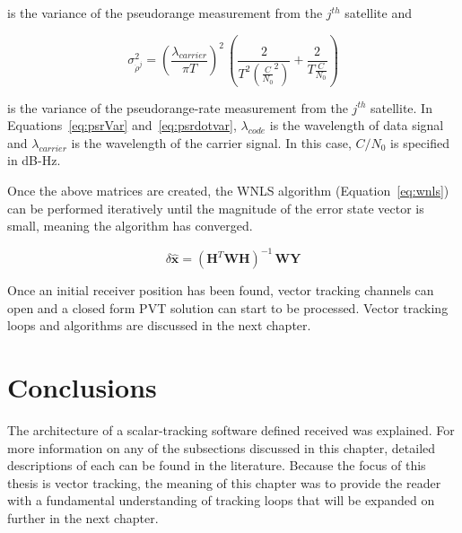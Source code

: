 is the variance of the pseudorange measurement from the \(j^{th}\) satellite and

\begin{equation}\label{eq:psrdotvar}
    \sigma^2_{\dot{\rho}^j} = {\left(\frac{\lambda_{carrier}}{\pi T}\right)}^2\,{\left(\frac{2}{T^2{\left(\frac{C}{N_0}^2\right)}} + \frac{2}{T \frac{C}{N_0}}\right)}
\end{equation}

is the variance of the pseudorange-rate measurement from the \(j^{th}\) satellite. In Equations~\ref{eq:psrVar} and~\ref{eq:psrdotvar}, \(\lambda_{code}\) is the wavelength of data signal and \(\lambda_{carrier}\) is the wavelength of the carrier signal. In this case, \(C/N_0\) is specified in dB-Hz.

Once the above matrices are created, the WNLS algorithm (Equation~\ref{eq:wnls}) can be performed iteratively until the magnitude of the error state vector is small, meaning the algorithm has converged.

\begin{equation}\label{eq:wnls}
    \delta\hat{\mathbf{x}} = {{\left(\mathbf{H}^{T}\mathbf{W}\mathbf{H}\right)}^{-1}\,\mathbf{W}\mathbf{Y}}
\end{equation}

Once an initial receiver position has been found, vector tracking channels can open and a closed form PVT solution can start to be processed. Vector tracking loops and algorithms are discussed in the next chapter.

\section{\textbf{Conclusions}}
The architecture of a scalar-tracking software defined received was explained. For more information on any of the subsections discussed in this chapter, detailed descriptions of each can be found in the literature. Because the focus of this thesis is vector tracking, the meaning of this chapter was to provide the reader with a fundamental understanding of tracking loops that will be expanded on further in the next chapter.